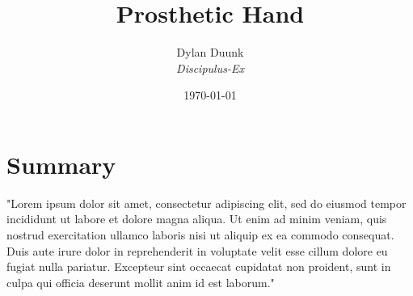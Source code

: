 \documentclass[a4paper]{article}
\title{\Huge{Prosthetic Hand} }
\author{Dylan Duunk \\ \textit{Discipulus-Ex} }
\date{\today}
\begin{document}
\begin{titlepage}
    \maketitle
\end{titlepage}

\newpage
\tableofcontents
\newpage
{}

\section{Summary}
"Lorem ipsum dolor sit amet, consectetur adipiscing elit, sed do eiusmod tempor incididunt ut labore et dolore magna aliqua. 
Ut enim ad minim veniam, quis nostrud exercitation ullamco laboris nisi ut aliquip ex ea commodo consequat. 
Duis aute irure dolor in reprehenderit in voluptate velit esse cillum dolore eu fugiat nulla pariatur. 
Excepteur sint occaecat cupidatat non proident, sunt in culpa qui officia deserunt mollit anim id est laborum."
\end{document}
